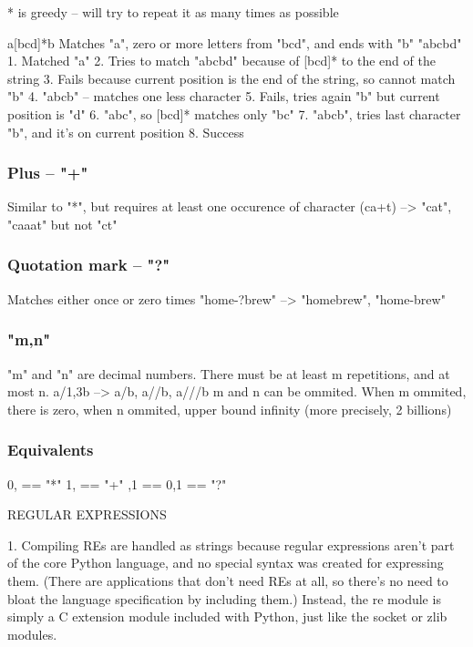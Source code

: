 \documentclass{beamer}
\begin{document}
\begin{frame}
* is greedy -- will try to repeat it as many times as possible

a[bcd]*b
Matches "a", zero or more letters from "bcd", and ends with "b"
"abcbd"
1. Matched "a"
2. Tries to match "abcbd" because of [bcd]* to the end of the string
3. Fails because current position is the end of the string, so cannot match "b"
4. "abcb" -- matches one less character
5. Fails, tries again "b" but current position is "d"
6. "abc", so [bcd]* matches only "bc"
7. "abcb", tries last character "b", and it's on current position
8. Success
\end{frame}

\subsubsection{Plus -- "+"}
\begin{frame}
Similar to "*", but requires at least one occurence of character
(ca+t) --> "cat", "caaat" but not "ct"
\end{frame}

\subsubsection{Quotation mark -- "?"}
\begin{frame}
Matches either once or zero times
"home-?brew" --> "homebrew", "home-brew"
\end{frame}

\subsubsection{"{m,n}"}
\begin{frame}
"m" and "n" are decimal numbers. There must be at least m repetitions, and at most n.
a/{1,3}b --> a/b, a//b, a///b
\pause
m and n can be ommited. When m ommited, there is zero, when n ommited, upper bound infinity (more precisely, 2 billions)
\end{frame}

\subsubsection{Equivalents}
\begin{frame}
{0,} == "*"
{1,} == "+"
{,1} == {0,1} == "?"
\end{frame}

REGULAR EXPRESSIONS

1. Compiling
REs are handled as strings because regular expressions aren’t part of the core Python language, and no special syntax was created for expressing them. (There are applications that don’t need REs at all, so there’s no need to bloat the language specification by including them.) Instead, the re module is simply a C extension module included with Python, just like the socket or zlib modules.
\end{document}
